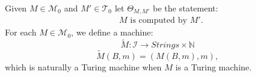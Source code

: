 \documentclass{amsart}  %
\numberwithin{equation}{section}
\theoremstyle{definition}
\theoremstyle{remark}
\begin{document}
{%
Given $M \in \mathcal{M} _{0} $ and $M' \in \mathcal{T} _{0} $ let $\Theta _{M,M'} $ be the statement:
\begin{equation}
\begin{split} \label{eq:assertion1}
   &  \text {$M$ is computed by $M'$}.
\end{split}   
 \end{equation}
For each $M \in \mathcal{M} _{0}$, we define a machine: 
$$\widetilde{M}: \mathcal{I} \to Strings \times \mathbb{N}  $$ 
\begin{equation} \label{eq:S0D1}
\widetilde{M}   (B,m) = (M (B,m),m),
\end{equation}
which is naturally a Turing machine when $M$ is a Turing machine.

}
\end{document}
